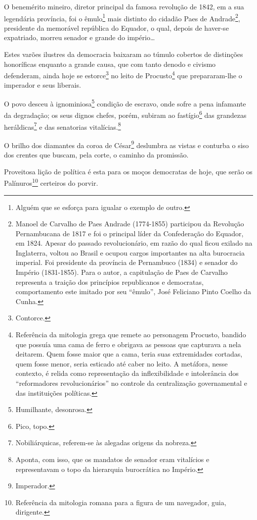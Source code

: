 O benemérito mineiro, diretor principal da famosa revolução de 1842, em
a sua legendária província, foi o êmulo\footnote{Alguém que se esforça
  para igualar o exemplo de outro.} mais distinto do cidadão Paes de
Andrade\footnote{Manoel de Carvalho de Paes Andrade (1774-1855)
  participou da Revolução Pernambucana de 1817 e foi o principal líder
  da Confederação do Equador, em 1824. Apesar do passado revolucionário,
  em razão do qual ficou exilado na Inglaterra, voltou ao Brasil e
  ocupou cargos importantes na alta burocracia imperial. Foi presidente
  da província de Pernambuco (1834) e senador do Império (1831-1855).
  Para o autor, a capitulação de Paes de Carvalho representa a traição
  dos princípios republicanos e democratas, comportamento este imitado
  por seu ``êmulo'', José Feliciano Pinto Coelho da Cunha.}, presidente da
memorável república do Equador, o qual, depois de haver-se expatriado,
morreu senador e grande do império\ldots{}

Estes varões ilustres da democracia baixaram ao túmulo cobertos de
distinções honoríficas enquanto a grande causa, que com tanto denodo e
civismo defenderam, ainda hoje se estorce\footnote{Contorce.} no leito
de Procusto\footnote{Referência da mitologia grega que remete ao
  personagem Procusto, bandido que possuía uma cama de ferro e obrigava
  as pessoas que capturava a nela deitarem. Quem fosse maior que a cama,
  teria suas extremidades cortadas, quem fosse menor, seria esticado até
  caber no leito. A metáfora, nesse contexto, é relida como
  representação da inflexibilidade e intolerância dos ``reformadores
  revolucionários'' no controle da centralização governamental e das
  instituições políticas.} que prepararam-lhe o imperador e seus
liberais.

O povo desceu à ignominiosa\footnote{Humilhante, desonrosa.} condição
de escravo, onde sofre a pena infamante da degradação; os seus dignos
chefes, porém, subiram ao fastígio\footnote{Pico, topo.} das grandezas
heráldicas\footnote{Nobiliárquicas, referem-se às alegadas origens da
  nobreza.} e das senatorias vitalícias.\footnote{Aponta, com isso,
  que os mandatos de senador eram vitalícios e representavam o topo da
  hierarquia burocrática no Império.}

O brilho dos diamantes da coroa de César\footnote{Imperador.}
deslumbra as vistas e conturba o siso dos crentes que buscam, pela
corte, o caminho da promissão.

Proveitosa lição de política é esta para os moços democratas de hoje,
que serão os Palínuros\footnote{Referência da mitologia romana para a
  figura de um navegador, guia, dirigente.} certeiros do porvir.


